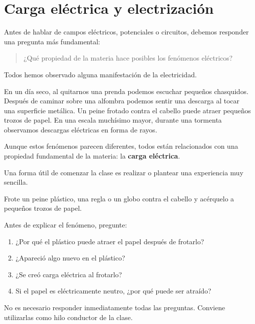 


\section{Carga eléctrica y electrización}

Antes de hablar de campos eléctricos, potenciales o circuitos, debemos
responder una pregunta más fundamental:

\begin{quote}
¿Qué propiedad de la materia hace posibles los fenómenos eléctricos?
\end{quote}

Todos hemos observado alguna manifestación de la electricidad.

En un día seco, al quitarnos una prenda podemos escuchar pequeños
chasquidos. Después de caminar sobre una alfombra podemos sentir una
descarga al tocar una superficie metálica. Un peine frotado contra el cabello
puede atraer pequeños trozos de papel. En una escala muchísimo mayor,
durante una tormenta observamos descargas eléctricas en forma de rayos.

Aunque estos fenómenos parecen diferentes, todos están relacionados con una
propiedad fundamental de la materia: la \textbf{carga eléctrica}.

\begin{notapedagogica}
Una forma útil de comenzar la clase es realizar o plantear una experiencia
muy sencilla.

Frote un peine plástico, una regla o un globo contra el cabello y acérquelo
a pequeños trozos de papel.

Antes de explicar el fenómeno, pregunte:

\begin{enumerate}
    \item ¿Por qué el plástico puede atraer el papel después de frotarlo?
    \item ¿Apareció algo nuevo en el plástico?
    \item ¿Se creó carga eléctrica al frotarlo?
    \item Si el papel es eléctricamente neutro, ¿por qué puede ser atraído?
\end{enumerate}

No es necesario responder inmediatamente todas las preguntas. Conviene
utilizarlas como hilo conductor de la clase.
\end{notapedagogica}


